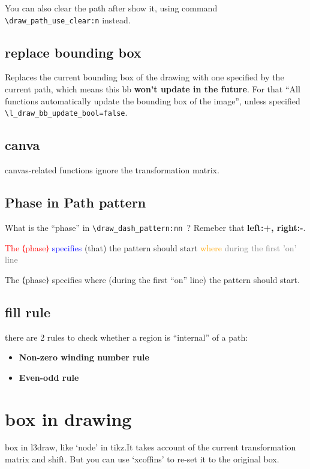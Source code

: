 \documentclass{article}
\begin{document}
You can also clear the path after show it, using command \verb|\draw_path_use_clear:n| instead.

\subsection{replace bounding box}
Replaces the current bounding box of the drawing with one specified by the current path, which means 
this bb \textbf{won't update in the future}. For that ``All functions automatically update the bounding 
box of the image'', unless specified \verb|\l_draw_bb_update_bool=false|.

\subsection{canva}
canvas-related functions ignore the transformation matrix.

\subsection{Phase in Path pattern}
What is the ``phase'' in \verb|\draw_dash_pattern:nn |? Remeber that \textbf{left:+, right:-}.

\vspace*{2em}
\noindent\textcolor{red}{The ⟨phase⟩} \textcolor{blue}{specifies} (that) 
the pattern should start \textcolor{orange}{where} \textcolor{gray}{during the first 'on' line}

\noindent The ⟨phase⟩ specifies where (during the first “on” line) the pattern should start.

\subsection{fill rule}
there are 2 rules to check whether a region is ``internal'' of a path:
\begin{itemize}
  \item \textbf{Non-zero winding number rule}
  \item \textbf{Even-odd rule}
\end{itemize}

\section{box in drawing}
box in l3draw, like `node' in tikz.It takes account of the current transformation matrix
and shift. But you can use `xcoffins' to re-set it to the original box.
\end{document}
